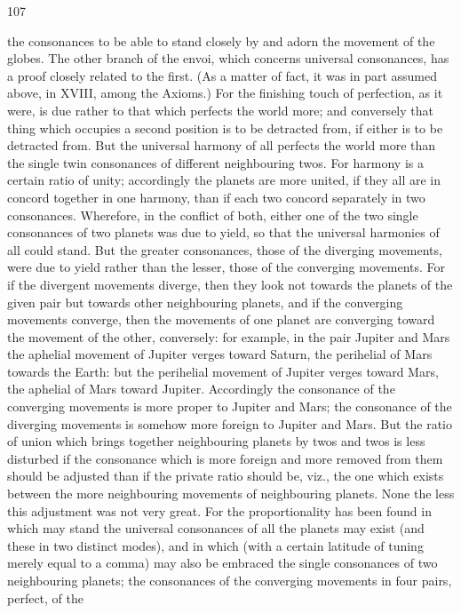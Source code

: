 \documentclass{article}
\begin{document}
107

the consonances to be able to stand closely by and adorn the movement
of the globes.
The other branch of the envoi, which concerns universal consonances,
has a proof closely related to the first. (As a matter of fact, it was in part
assumed above, in XVIII, among the Axioms.) For the finishing touch of
perfection, as it were, is due rather to that which perfects the world
more; and conversely that thing which occupies a second position is to
be detracted from, if either is to be detracted from. But the universal
harmony of all perfects the world more than the single twin consonances
of different neighbouring twos. For harmony is a certain ratio of unity;
accordingly the planets are more united, if they all are in concord
together in one harmony, than if each two concord separately in two
consonances. Wherefore, in the conflict of both, either one of the two
single consonances of two planets was due to yield, so that the universal
harmonies of all could stand. But the greater consonances, those of the
diverging movements, were due to yield rather than the lesser, those of
the converging movements. For if the divergent movements diverge,
then they look not towards the planets of the given pair but towards
other neighbouring planets, and if the converging movements converge,
then the movements of one planet are converging toward the movement
of the other, conversely: for example, in the pair Jupiter and Mars the
aphelial movement of Jupiter verges toward Saturn, the perihelial of
Mars towards the Earth: but the perihelial movement of Jupiter verges
toward Mars, the aphelial of Mars toward Jupiter. Accordingly the
consonance of the converging movements is more proper to Jupiter and
Mars; the consonance of the diverging movements is somehow more
foreign to Jupiter and Mars. But the ratio of union which brings together
neighbouring planets by twos and twos is less disturbed if the
consonance which is more foreign and more removed from them should
be adjusted than if the private ratio should be, viz., the one which exists
between the more neighbouring movements of neighbouring planets.
None the less this adjustment was not very great. For the proportionality
has been found in which may stand the universal consonances of all the
planets may exist (and these in two distinct modes), and in which (with a
certain latitude of tuning merely equal to a comma) may also be
embraced the single consonances of two neighbouring planets; the
consonances of the converging movements in four pairs, perfect, of the
\end{document}
